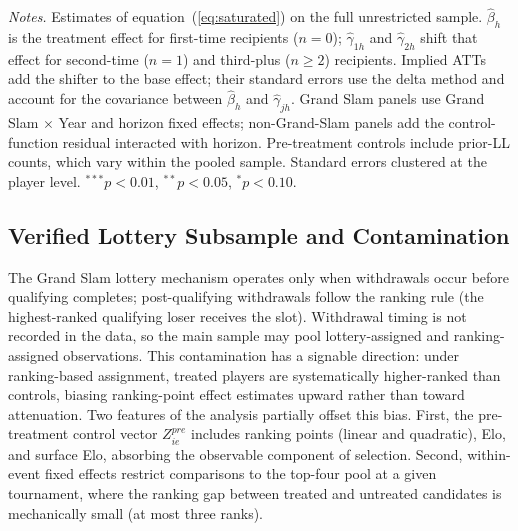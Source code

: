 \begin{table}[htbp]
\centering
\caption{Experience Gradient: Saturated Interaction Model (Ranking Points)}
\label{tab:saturated_experience}
\begin{threeparttable}
\scriptsize

\begin{tablenotes}
\footnotesize
\item \textit{Notes.} Estimates of equation~(\ref{eq:saturated}) on the full unrestricted sample. $\hat\beta_h$ is the treatment effect for first-time recipients ($n = 0$); $\hat\gamma_{1h}$ and $\hat\gamma_{2h}$ shift that effect for second-time ($n = 1$) and third-plus ($n \geq 2$) recipients. Implied ATTs add the shifter to the base effect; their standard errors use the delta method and account for the covariance between $\hat\beta_h$ and $\hat\gamma_{jh}$. Grand Slam panels use Grand Slam $\times$ Year and horizon fixed effects; non-Grand-Slam panels add the control-function residual interacted with horizon. Pre-treatment controls include prior-LL counts, which vary within the pooled sample. Standard errors clustered at the player level. $^{***}p<0.01$, $^{**}p<0.05$, $^{*}p<0.10$.
\end{tablenotes}
\end{threeparttable}
\end{table}

\subsection{Verified Lottery Subsample and Contamination}
\label{sec:robustness_verified}

The Grand Slam lottery mechanism operates only when withdrawals occur before qualifying completes; post-qualifying withdrawals follow the ranking rule (the highest-ranked qualifying loser receives the slot). Withdrawal timing is not recorded in the data, so the main sample may pool lottery-assigned and ranking-assigned observations. This contamination has a signable direction: under ranking-based assignment, treated players are systematically higher-ranked than controls, biasing ranking-point effect estimates upward rather than toward attenuation. Two features of the analysis partially offset this bias. First, the pre-treatment control vector $Z^{pre}_{ie}$ includes ranking points (linear and quadratic), Elo, and surface Elo, absorbing the observable component of selection. Second, within-event fixed effects restrict comparisons to the top-four pool at a given tournament, where the ranking gap between treated and untreated candidates is mechanically small (at most three ranks).

